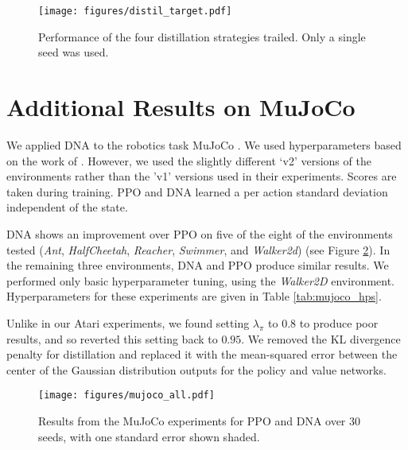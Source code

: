 \documentclass{article}
\begin{document}
\begin{figure}[h]
    \centering
    \texttt{[image: figures/distil\_target.pdf]}
    \caption{Performance of the four distillation strategies trailed. Only a single seed was used.}
    \label{fig:distil_target}
\end{figure}

\section{Additional Results on MuJoCo}
\label{app:mujoco}

We applied DNA to the robotics task MuJoCo \cite{todorov2012mujoco}. We used hyperparameters based on the work of \cite{schulman2017proximal}. However, we used the slightly different `v2' versions of the environments rather than the 'v1' versions used in their experiments. Scores are taken during training. PPO and DNA learned a per action standard deviation independent of the state. 

DNA shows an improvement over PPO on five of the eight of the environments tested (\textit{Ant}, \textit{HalfCheetah}, \textit{Reacher}, \textit{Swimmer}, and \textit{Walker2d}) (see Figure \ref{fig:mujoco}). In the remaining three environments, DNA and PPO produce similar results. We performed only basic hyperparameter tuning, using the \textit{Walker2D} environment. Hyperparameters for these experiments are given in Table \ref{tab:mujoco_hps}. 

Unlike in our Atari experiments, we found setting $\lambda_\pi$ to $0.8$ to produce poor results, and so reverted this setting back to $0.95$. We removed the KL divergence penalty for distillation and replaced it with the mean-squared error between the center of the Gaussian distribution outputs for the policy and value networks.

\begin{figure}
    \centering
    \texttt{[image: figures/mujoco\_all.pdf]}
    \caption{Results from the MuJoCo experiments for PPO and DNA over 30 seeds, with one standard error shown shaded.}
    \label{fig:mujoco}
\end{figure}
\end{document}
